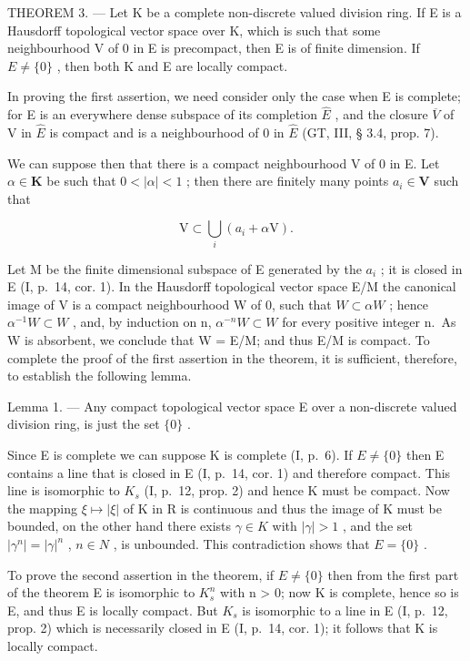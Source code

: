 THEOREM 3. --- Let K be a complete non-discrete valued division ring. If E is a Hausdorff topological vector space over K, which is such that some neighbourhood V of 0 in E is precompact, then E is of finite dimension. If \(E \neq \{0\}\) , then both K and E are locally compact.

In proving the first assertion, we need consider only the case when E is complete; for E is an everywhere dense subspace of its completion \(\hat{E}\) , and the closure \(\overline{V}\) of V in \(\hat{E}\) is compact and is a neighbourhood of 0 in \(\hat{E}\) (GT, III, § 3.4, prop. 7).

We can suppose then that there is a compact neighbourhood V of 0 in E. Let \(\alpha \in \mathbf{K}\) be such that \(0 < |\alpha| < 1\) ; then there are finitely many points \(a_i \in \mathbf{V}\) such that

\[
\mathrm{V} \subset \bigcup_ {i} (a _ {i} + \alpha \mathrm{V}).
\]

Let M be the finite dimensional subspace of E generated by the \(a_{i}\) ; it is closed in E (I, p.~14, cor. 1). In the Hausdorff topological vector space E/M the canonical image of V is a compact neighbourhood W of 0, such that \(W \subset \alpha W\) ; hence \(\alpha^{-1} W \subset W\) , and, by induction on n, \(\alpha^{-n} W \subset W\) for every positive integer n.~As W is absorbent, we conclude that W = E/M; and thus E/M is compact. To complete the proof of the first assertion in the theorem, it is sufficient, therefore, to establish the following lemma.

Lemma 1. --- Any compact topological vector space E over a non-discrete valued division ring, is just the set \(\{0\}\) .

Since E is complete we can suppose K is complete (I, p.~6). If \(E \neq \{0\}\) then E contains a line that is closed in E (I, p.~14, cor. 1) and therefore compact. This line is isomorphic to \(K_{s}\) (I, p.~12, prop. 2) and hence K must be compact. Now the mapping \(\xi \mapsto |\xi|\) of K in R is continuous and thus the image of K must be bounded, on the other hand there exists \(\gamma \in K\) with \(|\gamma| > 1\) , and the set \(|\gamma^{n}| = |\gamma|^{n}\) , \(n \in N\) , is unbounded. This contradiction shows that \(E = \{0\}\) .

To prove the second assertion in the theorem, if \(E \neq \{0\}\) then from the first part of the theorem E is isomorphic to \(K_{s}^{n}\) with n \textgreater{} 0; now K is complete, hence so is E, and thus E is locally compact. But \(K_{s}\) is isomorphic to a line in E (I, p.~12, prop. 2) which is necessarily closed in E (I, p.~14, cor. 1); it follows that K is locally compact.

